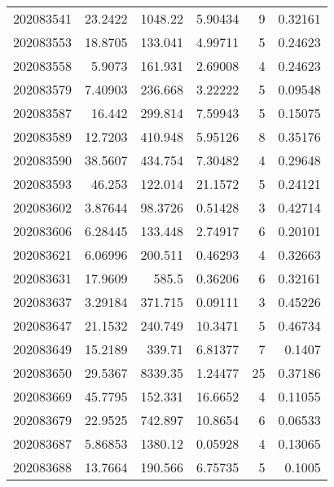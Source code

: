 \begin{tabular}{rrrrrr}
 202083541 &         23.2422  &     1048.22   &            5.90434 &           9 & 0.32161 \\
 202083553 &         18.8705  &      133.041  &            4.99711 &           5 & 0.24623 \\
 202083558 &          5.9073  &      161.931  &            2.69008 &           4 & 0.24623 \\
 202083579 &          7.40903 &      236.668  &            3.22222 &           5 & 0.09548 \\
 202083587 &         16.442   &      299.814  &            7.59943 &           5 & 0.15075 \\
 202083589 &         12.7203  &      410.948  &            5.95126 &           8 & 0.35176 \\
 202083590 &         38.5607  &      434.754  &            7.30482 &           4 & 0.29648 \\
 202083593 &         46.253   &      122.014  &           21.1572  &           5 & 0.24121 \\
 202083602 &          3.87644 &       98.3726 &            0.51428 &           3 & 0.42714 \\
 202083606 &          6.28445 &      133.448  &            2.74917 &           6 & 0.20101 \\
 202083621 &          6.06996 &      200.511  &            0.46293 &           4 & 0.32663 \\
 202083631 &         17.9609  &      585.5    &            0.36206 &           6 & 0.32161 \\
 202083637 &          3.29184 &      371.715  &            0.09111 &           3 & 0.45226 \\
 202083647 &         21.1532  &      240.749  &           10.3471  &           5 & 0.46734 \\
 202083649 &         15.2189  &      339.71   &            6.81377 &           7 & 0.1407  \\
 202083650 &         29.5367  &     8339.35   &            1.24477 &          25 & 0.37186 \\
 202083669 &         45.7795  &      152.331  &           16.6652  &           4 & 0.11055 \\
 202083679 &         22.9525  &      742.897  &           10.8654  &           6 & 0.06533 \\
 202083687 &          5.86853 &     1380.12   &            0.05928 &           4 & 0.13065 \\
 202083688 &         13.7664  &      190.566  &            6.75735 &           5 & 0.1005  \\

\end{tabular}
